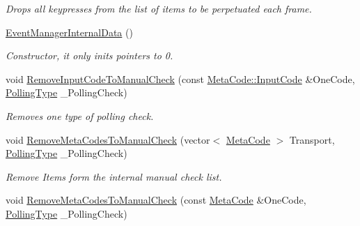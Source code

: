 \begin{DoxyCompactItemize}
\begin{DoxyCompactList}\small\item\em Drops all keypresses from the list of items to be perpetuated each frame. \item\end{DoxyCompactList}\item 
\hypertarget{structphys_1_1internal_1_1EventManagerInternalData_a2bc6e8af4992cc8b4935f4e5b32b32a0}{
\hyperlink{structphys_1_1internal_1_1EventManagerInternalData_a2bc6e8af4992cc8b4935f4e5b32b32a0}{EventManagerInternalData} ()}
\label{structphys_1_1internal_1_1EventManagerInternalData_a2bc6e8af4992cc8b4935f4e5b32b32a0}

\begin{DoxyCompactList}\small\item\em Constructor, it only inits pointers to 0. \item\end{DoxyCompactList}\item 
void \hyperlink{structphys_1_1internal_1_1EventManagerInternalData_aadc9e786da13f2c669fc7e054d8fbf37}{RemoveInputCodeToManualCheck} (const \hyperlink{classphys_1_1MetaCode_a3e501cbb5bf0f6f1fdb7211465bda8d8}{MetaCode::InputCode} \&OneCode, \hyperlink{structphys_1_1internal_1_1EventManagerInternalData_ab9ab8380b84448aacf46a63050e159af}{PollingType} \_\-PollingCheck)
\begin{DoxyCompactList}\small\item\em Removes one type of polling check. \item\end{DoxyCompactList}\item 
void \hyperlink{structphys_1_1internal_1_1EventManagerInternalData_a54babcae1822814f09beace684f97e72}{RemoveMetaCodesToManualCheck} (vector$<$ \hyperlink{classphys_1_1MetaCode}{MetaCode} $>$ Transport, \hyperlink{structphys_1_1internal_1_1EventManagerInternalData_ab9ab8380b84448aacf46a63050e159af}{PollingType} \_\-PollingCheck)
\begin{DoxyCompactList}\small\item\em Remove Items form the internal manual check list. \item\end{DoxyCompactList}\item 
void \hyperlink{structphys_1_1internal_1_1EventManagerInternalData_ade8d03121322cc467086d08df286cd51}{RemoveMetaCodesToManualCheck} (const \hyperlink{classphys_1_1MetaCode}{MetaCode} \&OneCode, \hyperlink{structphys_1_1internal_1_1EventManagerInternalData_ab9ab8380b84448aacf46a63050e159af}{PollingType} \_\-PollingCheck)

\end{DoxyCompactItemize}
